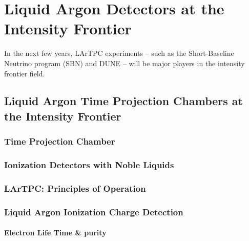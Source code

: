 \chapter{Liquid Argon Detectors at the Intensity Frontier}\label{ch:1}


In the next few years, LArTPC experiments -- such as the Short-Baseline Neutrino program (SBN) and DUNE -- will be major players in the intensity frontier field. 


\section{Liquid Argon Time Projection Chambers at the Intensity Frontier}



\subsection{Time Projection Chamber}
\subsection{Ionization Detectors with Noble Liquids}
\subsection{LArTPC: Principles of Operation}
\subsection{Liquid Argon Ionization Charge Detection}
\subsubsection{Electron Life Time \& purity}

